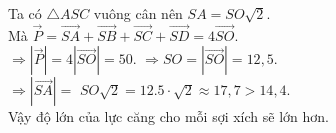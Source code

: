 \begin{ex}
{\begin{itemchoice}
            Ta có $\triangle ASC$ vuông cân nên $SA= SO\sqrt{2}$.\\
            Mà $\overrightarrow{P}=\overrightarrow{SA}+\overrightarrow{SB}+\overrightarrow{SC}+\overrightarrow{SD}= 4\overrightarrow{SO}$.\\
            $\Rightarrow \left|\overrightarrow{P} \right|= 4\left|\overrightarrow{SO}\right|=50$.
            $\Rightarrow SO = \left|\overrightarrow{SO} \right| = 12{,}5$.\\
            $\Rightarrow \left|\overrightarrow{SA}\right|=$
            $SO\sqrt{2} = 12.5\cdot\sqrt{2}\approx 17{,}7>14{,}4$.\\
            Vậy độ lớn của lực căng cho mỗi sợi xích sẽ lớn hơn.\\
        \end{itemchoice}
    }
\end{ex}

